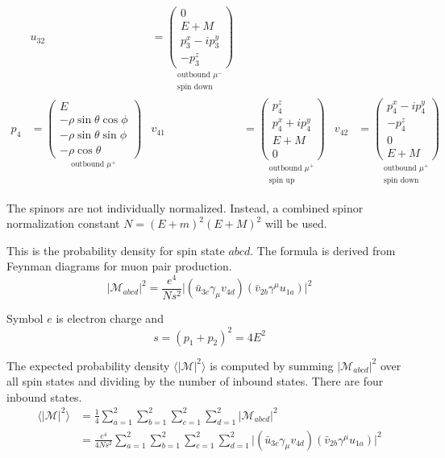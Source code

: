 \documentclass[12pt]{article}
\begin{document}
\begin{align*}
& u_{32}&=\underset{\substack{\text{outbound $\mu^-$}\\\text{spin down}}}
{\begin{pmatrix}0\\E+M\\p_3^x-ip_3^y\\-p_3^z\end{pmatrix}}
\\[1ex]
p_4&=\underset{\text{outbound $\mu^+$}}
{\begin{pmatrix}
E\\
-\rho\sin\theta\cos\phi\\
-\rho\sin\theta\sin\phi\\
-\rho\cos\theta
\end{pmatrix}}
& v_{41}&=\underset{\substack{\text{outbound $\mu^+$}\\\text{spin up}}}
{\begin{pmatrix}p_4^z\\p_4^x+ip_4^y\\E+M\\0\end{pmatrix}}
& v_{42}&=\underset{\substack{\text{outbound $\mu^+$}\\\text{spin down}}}
{\begin{pmatrix}p_4^x-ip_4^y\\-p_4^z\\0\\E+M\end{pmatrix}}
\end{align*}
\fi

The spinors are not individually normalized.
Instead, a combined spinor normalization constant $N=(E+m)^2(E+M)^2$ will be used.

\bigskip
This is the probability density for spin state $abcd$.
The formula is derived from Feynman diagrams for muon pair production.
\begin{equation*}
\big|\mathcal{M}_{abcd}\big|^2
=\frac{e^4}{Ns^2}\big|(\bar{u}_{3c}\gamma_\mu v_{4d})(\bar{v}_{2b}\gamma^\mu u_{1a})\big|^2
\end{equation*}

Symbol $e$ is electron charge and
\begin{equation*}
s=(p_1+p_2)^2=4E^2
\end{equation*}

The expected probability density $\langle|\mathcal{M}|^2\rangle$
is computed by summing $|\mathcal{M}_{abcd}|^2$ over all spin states
and dividing by the number of inbound states.
There are four inbound states.
\begin{align*}
\langle|\mathcal{M}|^2\rangle
&=\frac{1}{4}\sum_{a=1}^2\sum_{b=1}^2\sum_{c=1}^2\sum_{d=1}^2\big|\mathcal{M}_{abcd}\big|^2
\\
&=\frac{e^4}{4Ns^2}\sum_{a=1}^2\sum_{b=1}^2\sum_{c=1}^2\sum_{d=1}^2
\big|(\bar{u}_{3c}\gamma_\mu v_{4d})(\bar{v}_{2b}\gamma^\mu u_{1a})\big|^2
\end{align*}
\end{document}
